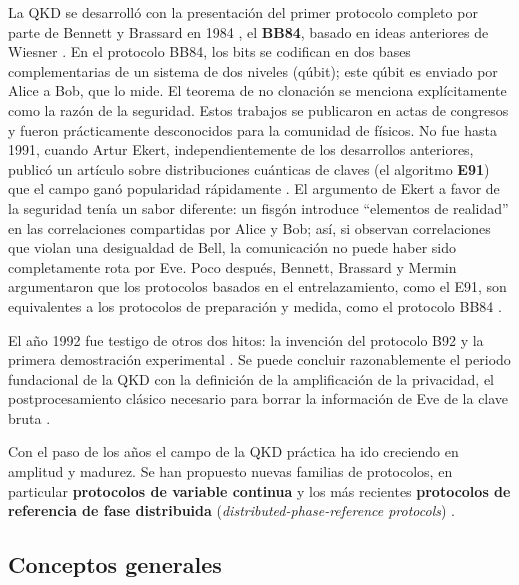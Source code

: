 \documentclass[a4paper,11pt]{book} %
\numberwithin{equation}{chapter}
\begin{document}
La QKD se desarrolló con la presentación del primer protocolo completo por parte de Bennett y Brassard en 1984 \cite{bib_BB84}, el \textbf{BB84}, basado en ideas anteriores de Wiesner \cite{bib_BB84_Wiesner_1983}. En el protocolo BB84, los bits se codifican en dos bases complementarias de un sistema de dos niveles (qúbit); este qúbit es enviado por Alice a Bob, que lo mide. El teorema de no clonación se menciona explícitamente como la razón de la seguridad. Estos trabajos se publicaron en actas de congresos y fueron prácticamente desconocidos para la comunidad de físicos. No fue hasta 1991, cuando Artur Ekert, independientemente de los desarrollos anteriores, publicó un artículo sobre distribuciones cuánticas de claves (el algoritmo \textbf{E91}) que el campo ganó popularidad rápidamente \cite{bib_Ekert-1991}. El argumento de Ekert a favor de la seguridad tenía un sabor diferente: un fisgón introduce ``elementos de realidad'' en las correlaciones compartidas por Alice y Bob; así, si observan correlaciones que violan una desigualdad de Bell, la comunicación no puede haber sido completamente rota por Eve. Poco después, Bennett, Brassard y Mermin argumentaron que los protocolos basados en el entrelazamiento, como el E91, son equivalentes a los protocolos de preparación y medida, como el protocolo BB84  \cite{bib_BB84_E91_iguales}. 

El año 1992 fue testigo de otros dos hitos: la invención del protocolo B92 \cite{bib_B92} y la primera demostración experimental \cite{bib_experiment_QKD}. Se puede concluir razonablemente el periodo fundacional de la QKD con la definición de la amplificación de la privacidad, el postprocesamiento clásico necesario para borrar la información de Eve de la clave bruta \cite{bib_Privacy_amplification}.

Con el paso de los años el campo de la QKD práctica ha ido creciendo en amplitud y madurez. Se han propuesto nuevas familias de protocolos, en particular \textbf{protocolos de variable continua} \cite{bib_Continue_var_Ralph_1999, bib_Continue_var_Hillery_2000, bib_Continue_var_Cerf_2001, bib_Continue_var_Gottesman_2001, bib_Continue_var_Grosshans_2002, bib_Continue_var_Silberhorn_2002} y los más recientes \textbf{protocolos de referencia de fase distribuida} (\textit{distributed-phase-reference protocols}) \cite{bib_Phase_Inoue_2002, bib_Phase_Stucki_2005}. 

	
		\subsection{Conceptos generales}
		
\end{document}

